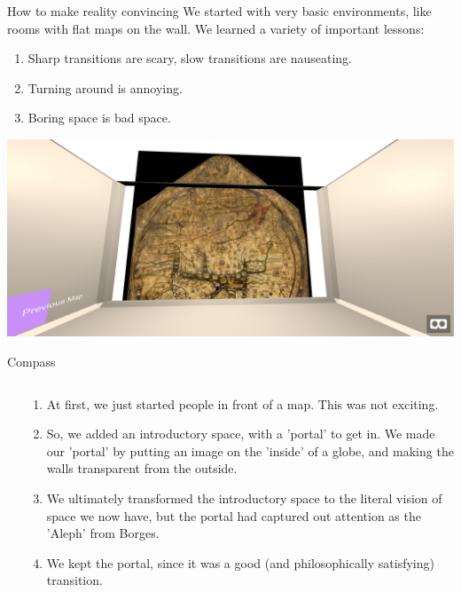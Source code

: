 \documentclass{beamer}
\begin{document}
\begin{frame}{How to make reality convincing}
	We started with very basic environments, like rooms with flat maps on
	the wall. We learned a variety of important lessons:
	\begin{enumerate}
		\item Sharp transitions are scary, slow transitions are
			nauseating.
		\item Turning around is annoying.
		\item Boring space is bad space.
	\end{enumerate}
	\includegraphics[width=\textwidth]{early}
\end{frame}
\begin{frame}{Compass}
	\begin{columns}[t]
		\begin{column}{.3\textwidth}
		\end{column}
		\begin{column}{.7\textwidth}
	\begin{enumerate}
		\item At first, we just started people in front of a map.
			This was not exciting.
		\item So, we added an introductory space, with a 'portal' to get in.
			We made our 'portal' by putting an image on the 'inside' of a globe,
			and making the walls transparent from the outside.
		\item We ultimately transformed the introductory space to the literal vision
			of space we now have, but the portal had captured out attention as
			the 'Aleph' from Borges.
		\item We kept the portal, since it was a good (and philosophically satisfying)
			transition.
	\end{enumerate}
		\end{column}
	\end{columns}
\end{frame}
\end{document}
